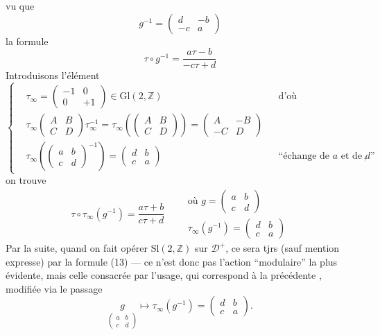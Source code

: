 vu que
\[
g^{-1}=\begin{pmatrix}d&-b\\-c&a\end{pmatrix}
\]
la formule
\[
\tau\circ g^{-1}=\frac{a\tau-b}{-c\tau+d}
\tag{11}
\]
Introduisons l'élément
\[
\left\{
\begin{aligned}
&\tau_\infty=\begin{pmatrix}-1&0\\0&+1\end{pmatrix}\in\mathrm{Gl}(2,\mathbb Z)
&&\text{d'où}\\
&\tau_\infty\begin{pmatrix}A&B\\C&D\end{pmatrix}\tau_\infty^{-1}
=\tau_\infty\left(\begin{pmatrix}A&B\\C&D\end{pmatrix}\right)
=\begin{pmatrix}A&-B\\-C&D\end{pmatrix}\\
&\tau_\infty\left(\begin{pmatrix}a&b\\c&d\end{pmatrix}^{-1}\right)
=\begin{pmatrix}d&b\\c&a\end{pmatrix}
&&\text{``échange de $a$ et de $d$''},
\end{aligned}
\right.
\tag{12}
\]
on trouve
\[
\tau\circ\tau_\infty(g^{-1})=\frac{a\tau+b}{c\tau+d}
\qquad
\begin{gathered}
\text{où }g=\begin{pmatrix}a&b\\c&d\end{pmatrix}\\
\tau_\infty(g^{-1})=\begin{pmatrix}d&b\\c&a\end{pmatrix}
\end{gathered}
\tag{13}
\]
Par la suite, quand on fait opérer $\mathrm{Sl}(2,\mathbb Z)$
sur $\mathcal D^+$, ce sera tjrs (sauf mention expresse)
par la formule (13) --- ce n'est donc pas
l'action ``modulaire'' la plus évidente, mais
celle consacrée par l'usage, qui correspond
à la précédente , modifiée via le
passage
\[
\underset{\begin{pmatrix}a&b\\c&d\end{pmatrix}}{g}
\longmapsto\tau_\infty(g^{-1})=\begin{pmatrix}d&b\\c&a\end{pmatrix}.
\]

